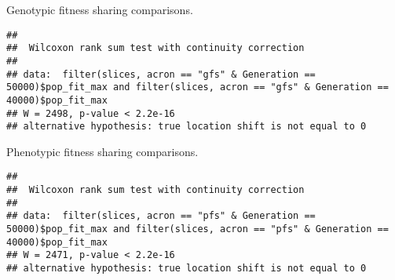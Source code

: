\documentclass[]{book}
\newenvironment{Shaded}{\begin{snugshade}}{\end{snugshade}}
\newcommand{\DataTypeTok}[1]{\textcolor[rgb]{0.13,0.29,0.53}{#1}}
\newcommand{\DecValTok}[1]{\textcolor[rgb]{0.00,0.00,0.81}{#1}}
\newcommand{\KeywordTok}[1]{\textcolor[rgb]{0.13,0.29,0.53}{\textbf{#1}}}
\newcommand{\NormalTok}[1]{#1}
\newcommand{\OperatorTok}[1]{\textcolor[rgb]{0.81,0.36,0.00}{\textbf{#1}}}
\newcommand{\StringTok}[1]{\textcolor[rgb]{0.31,0.60,0.02}{#1}}
\begin{document}
Genotypic fitness sharing comparisons.

\begin{Shaded}
\end{Shaded}

\begin{verbatim}
## 
##  Wilcoxon rank sum test with continuity correction
## 
## data:  filter(slices, acron == "gfs" & Generation == 50000)$pop_fit_max and filter(slices, acron == "gfs" & Generation == 40000)$pop_fit_max
## W = 2498, p-value < 2.2e-16
## alternative hypothesis: true location shift is not equal to 0
\end{verbatim}

Phenotypic fitness sharing comparisons.

\begin{Shaded}
\end{Shaded}

\begin{verbatim}
## 
##  Wilcoxon rank sum test with continuity correction
## 
## data:  filter(slices, acron == "pfs" & Generation == 50000)$pop_fit_max and filter(slices, acron == "pfs" & Generation == 40000)$pop_fit_max
## W = 2471, p-value < 2.2e-16
## alternative hypothesis: true location shift is not equal to 0
\end{verbatim}
\end{document}
